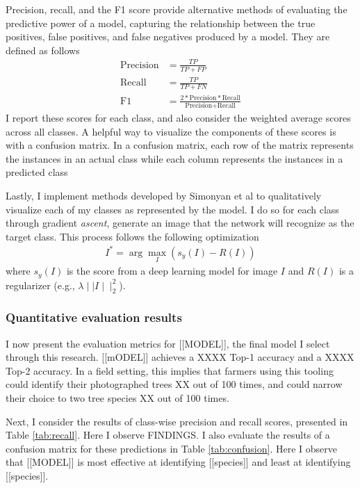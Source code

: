 \documentclass[10pt,twocolumn,letterpaper]{article}
\begin{document}
Precision, recall, and the F1 score provide alternative methods of evaluating the predictive power of a model, capturing the relationship between the true positives, false positives, and false negatives produced by a model. They are defined as follows
\begin{align*}
  \textrm{Precision} &= \frac{TP}{TP + FP}\\
  \textrm{Recall} &= \frac{TP}{TP + FN}\\
  \textrm{F1} &= \frac{2 * \textrm{Precision} * \textrm{Recall}}{\textrm{Precision} + \textrm{Recall}}
\end{align*}
I report these scores for each class, and also consider the weighted average scores across all classes. A helpful way to visualize the components of these scores is with a confusion matrix. In a confusion matrix, each row of the matrix represents the instances in an actual class while each column represents the instances in a predicted class

Lastly, I implement methods developed by Simonyan et al \cite{simonyan} to qualitatively visualize each of my classes as represented by the model. I do so for each class through gradient \textit{ascent}, generate an image that the network will recognize as the target class. This process follows the following optimization
\begin{align*}
  I^* = \arg\max_I(s_y(I) - R(I))
\end{align*}
where $s_y(I)$ is the score from a deep learning model for image $I$ and $R(I)$ is a regularizer (e.g., $\lambda \mid\mid I \mid\mid_2^2$).

\subsubsection{Quantitative evaluation results}
I now present the evaluation metrics for [[MODEL]], the final model I select through this research. [[mODEL]] achieves a XXXX Top-1 accuracy and a XXXX Top-2 accuracy. In a field setting, this implies that farmers using this tooling could identify their photographed trees XX out of 100 times, and could narrow their choice to two tree species XX out of 100 times. 

Next, I consider the results of class-wise precision and recall scores, presented in Table \ref{tab:recall}. Here I observe FINDINGS. I also evaluate the results of a confusion matrix for these predictions in Table \ref{tab:confusion}. Here I observe that [[MODEL]] is most effective at identifying [[species]] and least at identifying [[species]]. 
\end{document}
